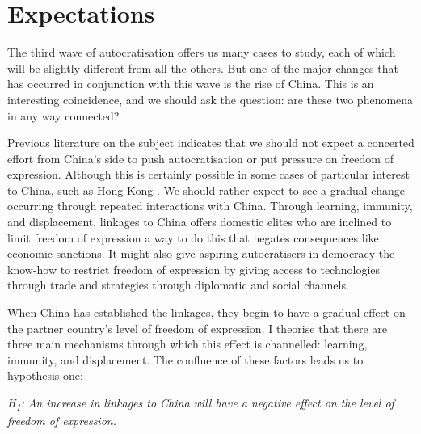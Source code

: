 \section{Expectations} \label{sec:hypotheses}
The third wave of autocratisation offers us many cases to study, each of which will be slightly different from all the others. But one of the major changes that has occurred in conjunction with this wave is the rise of China. This is an interesting coincidence, and we should ask the question: are these two phenomena in any way connected?

Previous literature on the subject indicates that we should not expect a concerted effort from China's side to push autocratisation or put pressure on freedom of expression. Although this is certainly possible in some cases of particular interest to China, such as Hong Kong \citep{chen_democracy_2015}. We should rather expect to see a gradual change occurring through repeated interactions with China. Through learning, immunity, and displacement, linkages to China offers domestic elites who are inclined to limit freedom of expression a way to do this that negates consequences like economic sanctions. It might also give aspiring autocratisers in democracy the know-how to restrict freedom of expression by giving access to technologies through trade and strategies through diplomatic and social channels. 

When China has established the linkages, they begin to have a gradual effect on the partner country's level of freedom of expression. I theorise that there are three main mechanisms through which this effect is channelled: learning, immunity, and displacement. The confluence of these factors leads us to hypothesis one:
\begin{displayquote}
    \textit{H\textsubscript{1}: An increase in linkages to China will have a negative effect on the level of freedom of expression.}  
\end{displayquote}

